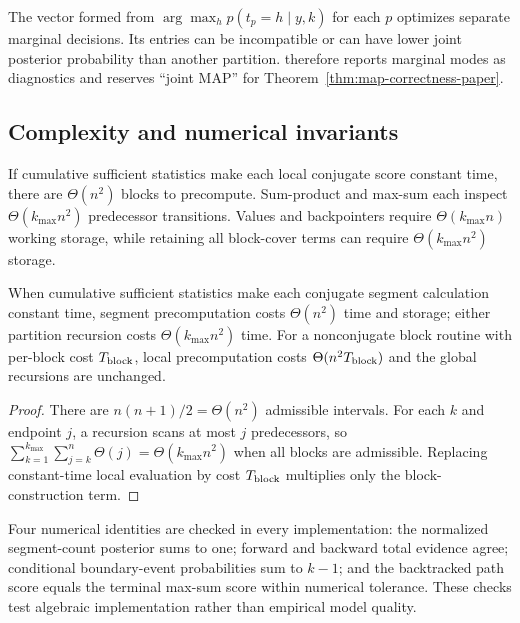 \begin{cautionbox}
The vector formed from $\arg\max_h p(t_p=h\mid y,k)$ for each $p$ optimizes separate marginal decisions. Its entries can be incompatible or can have lower joint posterior probability than another partition. \BayesBreak therefore reports marginal modes as diagnostics and reserves ``joint MAP'' for Theorem~\ref{thm:map-correctness-paper}.
\end{cautionbox}

\subsection{Complexity and numerical invariants}
If cumulative sufficient statistics make each local conjugate score constant time, there are $\Theta(n^2)$ blocks to precompute. Sum-product and max-sum each inspect $\Theta(k_{\max}n^2)$ predecessor transitions. Values and backpointers require $\Theta(k_{\max}n)$ working storage, while retaining all block-cover terms can require $\Theta(k_{\max}n^2)$ storage.

\begin{proposition}[Complexity]
\label{prop:complexity-paper}
When cumulative sufficient statistics make each conjugate segment calculation constant time, segment precomputation costs $\Theta(n^2)$ time and storage; either partition recursion costs $\Theta(k_{\max}n^2)$ time. For a nonconjugate block routine with per-block cost $T_{\rm block}$, local precomputation costs $\Theta(n^2T_{\rm block})$ and the global recursions are unchanged.
\end{proposition}
\begin{proof}
There are $n(n+1)/2=\Theta(n^2)$ admissible intervals. For each $k$ and endpoint $j$, a recursion scans at most $j$ predecessors, so $\sum_{k=1}^{k_{\max}}\sum_{j=k}^{n}\Theta(j)=\Theta(k_{\max}n^2)$ when all blocks are admissible. Replacing constant-time local evaluation by cost $T_{\rm block}$ multiplies only the block-construction term.
\end{proof}

Four numerical identities are checked in every implementation: the normalized segment-count posterior sums to one; forward and backward total evidence agree; conditional boundary-event probabilities sum to $k-1$; and the backtracked path score equals the terminal max-sum score within numerical tolerance. These checks test algebraic implementation rather than empirical model quality.
